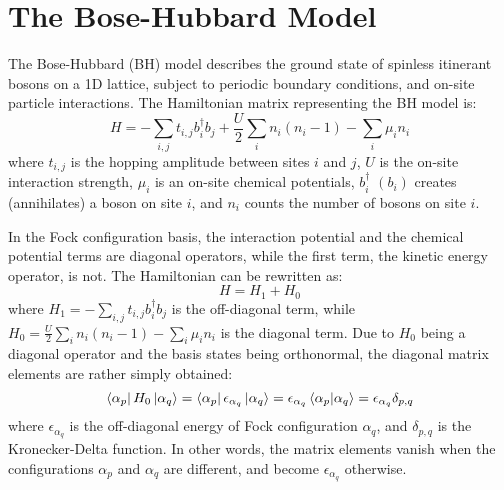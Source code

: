 \documentclass[12pt, two sided]{article}
\begin{document}


\section{The Bose-Hubbard Model}

The Bose-Hubbard (BH) model describes the ground state of spinless itinerant bosons on a 1D lattice, subject to periodic boundary conditions, and on-site particle interactions. The Hamiltonian matrix representing the BH model is:
%
\begin{equation}
\label{eq:bh_hamiltonian}
H = - \sum_{ i,j } t_{i,j} b_i^{\dag} b_j + \frac{U}{2} \sum_i n_i (n_i-1) - \sum_i \mu_i n_i
\end{equation}
%
where $t_{i,j}$ is the hopping amplitude between sites $i$ and $j$, $U$ is the on-site interaction strength, $\mu_i$ is an on-site chemical potentials,  $b_i^{\dag}$ $(b_i)$ creates (annihilates) a boson on site $i$, and $n_i$ counts the number of bosons on site $i$. 

In the Fock configuration basis, the interaction potential and the chemical potential terms are diagonal operators, while the first term, the kinetic energy operator, is not. The Hamiltonian can be rewritten as:
%
\begin{equation}
H = H_1 + H_0
\end{equation}
%
where $H_1 = - \sum_{i,j} t_{i,j} b_i^{\dag} b_j$ is the off-diagonal term, while $H_0 = \frac{U}{2} \sum_i n_i (n_i-1) - \sum_i \mu_i n_i$ is the diagonal term. Due to $H_0$ being a diagonal operator and the basis states being orthonormal, the diagonal matrix elements are rather simply obtained:
%
\begin{equation}
\label{eq:diagonal_elements}
\bra{\alpha_p} H_0 \ket{\alpha_q} =  \bra{\alpha_p}  \epsilon_{\alpha_q} \ket{\alpha_q}  = \epsilon_{\alpha_q} \bra{\alpha_p} \ket{\alpha_q} = \epsilon_{\alpha_q} \delta_{p,q}
\end{equation}
%
where $\epsilon_{\alpha_q}$ is the off-diagonal energy of Fock configuration $\alpha_q$, and $\delta_{p,q}$ is the Kronecker-Delta function. In other words, the matrix elements vanish when the configurations $\alpha_p$ and $\alpha_q$ are different, and become $\epsilon_{\alpha_q}$ otherwise.
\end{document}
